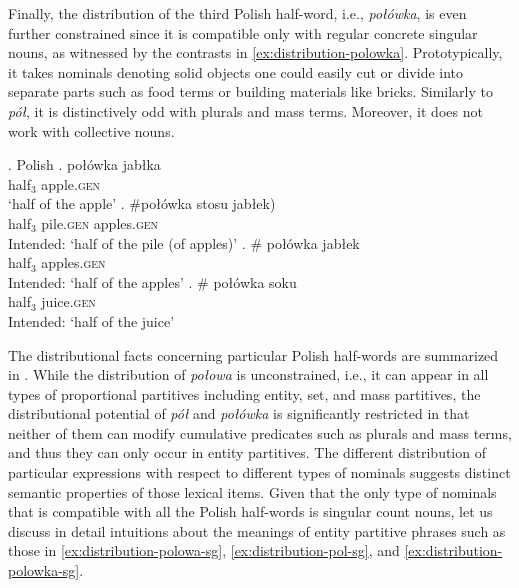 Finally, the distribution of the third Polish half-word, i.e., \textit{połówka}, is even further constrained since it is compatible only with regular concrete singular nouns, as witnessed by the contrasts in \ref{ex:distribution-polowka}. Prototypically, it takes nominals denoting solid objects one could easily cut or divide into separate parts such as food terms or building materials like bricks. Similarly to \textit{pół}, it is distinctively odd with plurals and mass terms. Moreover, it does not work with collective nouns. 

		\ex.\label{ex:distribution-polowka} Polish
        \ag. połówka jabłka\label{ex:distribution-polowka-sg}\\
		half$_3$ apple\textsc{.gen}\\
		`half of the apple'
		\bg. \#połówka stosu \minsp{(} jabłek)\label{ex:distribution-polowka-group}\\
		half$_3$ pile\textsc{.gen} {} apples\textsc{.gen}\\
		Intended: `half of the pile (of apples)'
		\bg. \# połówka jabłek\label{ex:distribution-polowka-pl}\\
		half$_3$ apples\textsc{.gen}\\
		Intended: `half of the apples'
		\bg. \# połówka soku\label{ex:distribution-polowka-mass}\\
		half$_3$ juice\textsc{.gen}\\
		Intended: `half of the juice'

The distributional facts concerning particular Polish half-words are summarized in . While the distribution of \textit{połowa} is unconstrained, i.e., it can appear in all types of proportional partitives including entity, set, and mass partitives, the distributional potential of \textit{pół} and \textit{połówka} is significantly restricted in that neither of them can modify cumulative predicates such as plurals and mass terms, and thus they can only occur in entity partitives. The different distribution of particular expressions with respect to different types of nominals suggests distinct semantic properties of those lexical items. Given that the only type of nominals that is compatible with all the Polish half-words is singular count nouns, let us discuss in detail intuitions about the meanings of entity partitive phrases such as those in \ref{ex:distribution-polowa-sg}, \ref{ex:distribution-pol-sg}, and \ref{ex:distribution-polowka-sg}.

